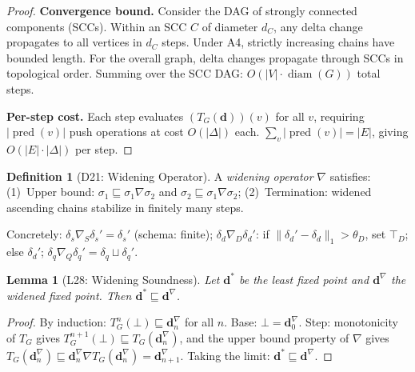 \documentclass[11pt,a4paper]{article}
\newtheorem{lemma}[theorem]{Lemma}
\theoremstyle{definition}
\newtheorem{definition}[theorem]{Definition}
\DeclareMathOperator{\pred}{pred}
\DeclareMathOperator{\diam}{diam}
\begin{document}
\begin{proof}
\textbf{Convergence bound.}  Consider the DAG of strongly connected components
(SCCs).  Within an SCC $C$ of diameter $d_C$, any delta change propagates to
all vertices in $d_C$ steps.  Under A4, strictly increasing chains have bounded
length.  For the overall graph, delta changes propagate through SCCs in
topological order.  Summing over the SCC DAG: $O(|V| \cdot \diam(G))$ total steps.

\textbf{Per-step cost.}  Each step evaluates $(T_G(\mathbf{d}))(v)$ for all $v$,
requiring $|\pred(v)|$ push operations at cost $O(|\Delta|)$ each.
$\sum_v |\pred(v)| = |E|$, giving $O(|E| \cdot |\Delta|)$ per step.
\end{proof}

\begin{definition}[D21: Widening Operator]\label{def:widening}
A \emph{widening operator} $\nabla$ satisfies:
(1)~Upper bound: $\sigma_1 \sqsubseteq \sigma_1 \nabla \sigma_2$ and
$\sigma_2 \sqsubseteq \sigma_1 \nabla \sigma_2$;
(2)~Termination: widened ascending chains stabilize in finitely many steps.

Concretely: $\delta_s \nabla_S \delta_s' = \delta_s'$ (schema: finite);
$\delta_d \nabla_D \delta_d'$: if $\|\delta_d' - \delta_d\|_1 > \theta_D$,
set $\top_D$; else $\delta_d'$;
$\delta_q \nabla_Q \delta_q' = \delta_q \sqcup \delta_q'$.
\end{definition}

\begin{lemma}[L28: Widening Soundness]\label{lem:widening-sound}
Let $\mathbf{d}^*$ be the least fixed point and $\mathbf{d}^\nabla$ the widened
fixed point.  Then $\mathbf{d}^* \sqsubseteq \mathbf{d}^\nabla$.
\end{lemma}

\begin{proof}
By induction: $T_G^n(\bot) \sqsubseteq \mathbf{d}_n^\nabla$ for all $n$.
Base: $\bot = \mathbf{d}_0^\nabla$.  Step: monotonicity of $T_G$ gives
$T_G^{n+1}(\bot) \sqsubseteq T_G(\mathbf{d}_n^\nabla)$, and the upper bound
property of $\nabla$ gives
$T_G(\mathbf{d}_n^\nabla) \sqsubseteq \mathbf{d}_n^\nabla \nabla
T_G(\mathbf{d}_n^\nabla) = \mathbf{d}_{n+1}^\nabla$.
Taking the limit: $\mathbf{d}^* \sqsubseteq \mathbf{d}^\nabla$.
\end{proof}
\end{document}
